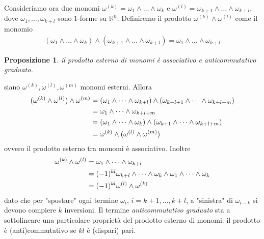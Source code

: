 \documentclass[oneside, 11pt]{amsbook}
\makeatletter
\newcommand{\0}{{(0)}}
\newcommand{\3}{{(3)}}
\theoremstyle{colonplain}
\newtheorem{prop}[thm]{Proposizione}
\theoremstyle{colondefinition}
\theoremstyle{colonremark}
\numberwithin{equation}{chapter}
\renewcommand{\proofname}{Dimostrazione}
\renewenvironment{proof}[1][\proofname]{\par
  \pushQED{\qed}%
  \normalfont \topsep6\p@\@plus6\p@\relax
  \trivlist
  \item[\hskip\labelsep\bfseries #1:]\ignorespaces
}{%
  \popQED\endtrivlist\@endpefalse
}
\makeatother
\begin{document}
Consideriamo ora due monomi $\omega^{(k)} = \omega_1 \wedge \dots \wedge \omega_k$ e $\omega^{(l)} = \omega_{k + 1} \wedge \dots \wedge \omega_{k + l}$, dove $\omega_1, \dots, \omega_{k + l}$ sono $1$-forme su $\mathbb{R}^n$. Definiremo il prodotto $\omega^{(k)} \wedge \omega^{(l)}$ come il monomio 
\begin{align}
    (\omega_1 \wedge \dots \wedge \omega_k) \wedge (\omega_{k + 1} \wedge \dots \wedge \omega_{k + l}) = \omega_1 \wedge \dots \wedge \omega_{k + l} 
\end{align}
\begin{prop}\label{Assoc&CommExtProd} il prodotto esterno di monomi è associativo e anticommutativo graduato.
\end{prop}
\begin{proof} siano $\omega^{(k)}, \omega^{(l)}, \omega^{(m)}$ monomi esterni. Allora 
\begin{align}
    (\omega^{(k)} \wedge \omega^{(l)}) \wedge \omega^{(m)} &= (\omega_1 \wedge \dots \wedge \omega_{k + l}) \wedge (\omega_{k + l + 1} \wedge \dots \wedge \omega_{k + l + m}) \notag \\
    &= \omega_1 \wedge \dots \wedge \omega_{k + l + m} \notag \\
    &= (\omega_1 \wedge \dots \wedge \omega_{k}) \wedge (\omega_{k + 1} \wedge \dots \wedge \omega_{k + l + m}) \notag \\
    &= \omega^{(k)} \wedge (\omega^{(l)} \wedge \omega^{(m)}) \notag
\end{align}
ovvero il prodotto esterno tra monomi è associativo. Inoltre 
\begin{align}
    \omega^{(k)} \wedge \omega^{(l)} &= \omega_1 \wedge \dots \wedge \omega_{k + l} \notag \\
    &= (-1)^{kl}\omega_{k + l} \wedge \dots \wedge \omega_k \wedge \omega_1 \wedge \dots \wedge \omega_k \notag \\
    &= (-1)^{kl}\omega^{(l)} \wedge \omega^{(k)} \notag
\end{align}
dato che per "spostare" ogni termine $\omega_i$, $i = k + 1, \dots, k + l$, a "sinistra" di $\omega_{i - k}$ si devono compiere $k$ inversioni.
\end{proof}
Il termine \textit{anticommutativo graduato} sta a sottolineare una particolare proprietà del prodotto esterno di monomi: il prodotto è (anti)commutativo se $kl$ è (dispari) pari.
\end{document}
